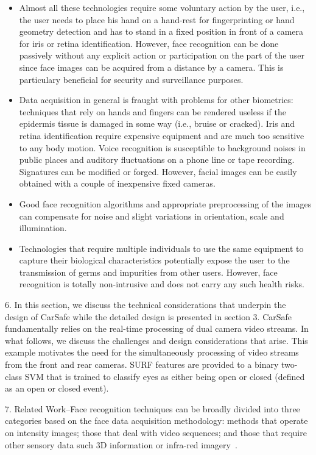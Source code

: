 \begin{itemize}
    \item Almost all these technologies require some voluntary action by the user, i.e., the user needs to place his hand on a hand-rest for fingerprinting or hand geometry detection and has to stand in a fixed position in front of a camera for iris or retina identification. However, face recognition can be done passively without any explicit action or participation on the part of the user since face images can be acquired from a distance by a camera. This is particulary beneficial for security and surveillance purposes.
    \item Data acquisition in general is fraught with problems for other biometrics: techniques that rely on hands and fingers can be rendered useless if the epidermis tissue is damaged in some way (i.e., bruise or cracked). Iris and retina identification require expensive equipment and are much too sensitive to any body motion. Voice recognition is susceptible to background noises in public places and auditory fluctuations on a phone line or tape recording. Signatures can be modified or forged. However, facial images can be easily obtained with a couple of inexpensive fixed cameras.
    \item Good face recognition algorithms and appropriate preprocessing of the images can compensate for noise and slight variations in orientation, scale and illumination.
    \item Technologies that require multiple individuals to use the same equipment to capture their biological characteristics potentially expose the user to the transmission of germs and impurities from other users. However, face recognition is totally non-intrusive and does not carry any such health risks.
\end{itemize}

6. In this section, we discuss the technical considerations that underpin the design of CarSafe while the detailed design is presented in section 3.  CarSafe fundamentally relies on the real-time processing of dual camera video streams. In what follows, we discuss the challenges and design considerations that arise.  This example motivates the need for the simultaneously processing of video streams from the front and rear cameras. SURF features are provided to a binary two-class SVM that is trained to classify eyes as either being open or closed (defined as an open or closed event).

7. Related Work--Face recognition techniques can be broadly divided into three categories based on the face data acquisition methodology: methods that operate on intensity images; those that deal with video sequences; and those that require other sensory data such 3D information or infra-red imagery~\cite{Jafri2009A}.

